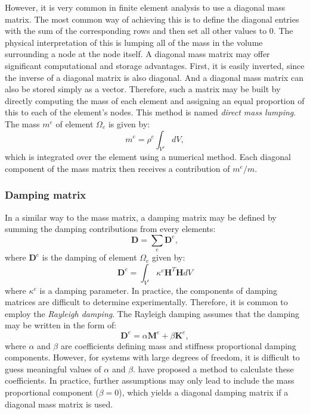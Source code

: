 However, it is very common in finite element analysis to use a diagonal mass matrix. The most common way of achieving this is to define the diagonal entries with the sum of the corresponding rows and then set all other values to 0. The physical interpretation of this is lumping all of the mass in the volume surrounding a node at the node itself. A diagonal mass matrix may offer significant computational and storage advantages. First, it is easily inverted, since the inverse of a diagonal matrix is also diagonal. And a diagonal mass matrix can also be stored simply as a vector. Therefore, such a matrix may be built by directly computing the mass of each element and assigning an equal proportion of this to each of the element's nodes. This method is named \emph{direct mass lumping}. The mass $ m^e $ of element $ \Omega_e $ is given by:
\begin{equation}
m^e = \rho^e \int_{V^e} dV,
\end{equation}
which is integrated over the element using a numerical method. Each diagonal component of the mass matrix then receives a contribution of $ m^e/m $. 
		
		\subsubsection*{Damping matrix}
In a similar way to the mass matrix, a damping matrix may be defined by summing the damping contributions from every elements:
\begin{equation}
\mathbf{D} = \sum_e \mathbf{D}^e,
\end{equation}
where $ \mathbf{D}^e $ is the damping of element $ \Omega_e $ given by:
\begin{equation}
\mathbf{D}^e = \int_{V^e} \kappa^e \mathbf{H}^T \mathbf{H} dV
\end{equation}
where $ \kappa^e $ is a damping parameter. In practice, the components of damping matrices are difficult to determine experimentally. Therefore, it is common to employ the \emph{Rayleigh damping}. The Rayleigh damping assumes that the damping may be written in the form of:
\begin{equation}
\mathbf{D}^e = \alpha \mathbf{M}^e + \beta \mathbf{K}^e,
\end{equation}
where $ \alpha $ and $ \beta $ are coefficients defining mass and stiffness proportional damping components. However, for systems with large degrees of freedom, it is difficult to guess meaningful values of $ \alpha $ and $ \beta $. \cite{Chowdhury03} have proposed a method to calculate these coefficients. In practice, further assumptions may only lead to include the mass proportional component ($ \beta = 0 $), which yields a diagonal damping matrix if a diagonal mass matrix is used. 

